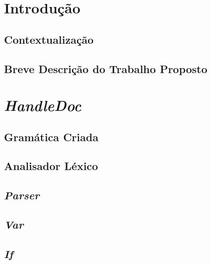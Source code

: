 \documentclass[11pt]{report}
\begin{document}
\maketitle    

\tableofcontents


%
%
%
\chapter{Introdução}
\section{Contextualização} 



\section{Breve Descrição do Trabalho Proposto}



\chapter{\textit{HandleDoc}}
\section{Gramática Criada} \label{subsec:grammar}

\section{Analisador Léxico} \label{subsec:lex}

\section{\textit{Parser}} \label{subsec:strat}


\section{\textit{Var}} \label{subsec:var}


\section{\textit{If}} \label{subsec:If}

\end{document}
